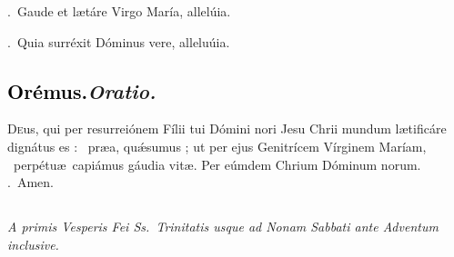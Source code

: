 \documentclass[12pt]{article} %
\newenvironment{rubric}{\vspace{2 mm}\color{benred8} \itshape \leftskip 0in \setlength{\parindent}{0.25in}}{\vspace{2 mm}}
\newenvironment{response}{\leftskip 0in \setlength{\parindent}{0in}}{\vspace{2 mm}}
\let\oldgresixstar\gresixstar
\renewcommand{\gresixstar}{\textcolor{benred8}{\oldgresixstar}}
\let\oldgredagger\gredagger
\renewcommand{\gredagger}{\textcolor{benred8}{\oldgredagger}}
\let\oldVbar\Vbar
\renewcommand{\Vbar}{\textcolor{benred8}{\oldVbar .}}
\let\oldRbar\Rbar
\renewcommand{\Rbar}{\textcolor{benred8}{\oldRbar .}}
\def\capitulumSpace{\hspace{20 mm}}
\begin{document}

\gresetfirstlineaboveinitial{\small \textsc{ \textbf{\textcolor{benred8}{VI}}}}{\small \textsc{ \textbf{\textcolor{benred8}{VI}}}}

\vspace{2mm}

\begin{response}
\Vbar\ Gaude et l\ae t\'{a}re Virgo Mar\'{i}a, allel\'{u}ia.

\Rbar\ Quia surr\'{e}xit D\'{o}minus vere, allelu\'{u}ia.

\end{response}

\subsection*{\textcolor{black}{Or\'{e}mus.}\capitulumSpace \emph{Oratio.}}

\begin{response}\lettrine{D}{e}us, qui per resurrei\'{o}nem F\'{i}lii tui D\'{o}mini nori Jesu Chrii mundum l\ae tific\'{a}re dign\'{a}tus es : \gredagger\ pr\ae{}a, qu\'{\ae}sumus ; ut per ejus Genitr\'{i}cem V\'{i}rginem Mar\'{i}am, \gresixstar\ perp\'{e}tu\ae\ capi\'{a}mus g\'{a}udia vit\ae . Per e\'{u}mdem Chrium D\'{o}minum norum. \Rbar\ Amen.

\end{response}


\subsection*{}

\begin{rubric}
A primis Vesperis Fei Ss.~Trinitatis usque ad Nonam Sabbati ante Adventum inclusive.

\end{rubric}


{\grespacelinestext=4.60mm
\gresetfirstlineaboveinitial{\small \textsc{ \textbf{\textcolor{benred8}{I}}}}{\small \textsc{ \textbf{\textcolor{benred8}{I}}}}

}
\end{document}
